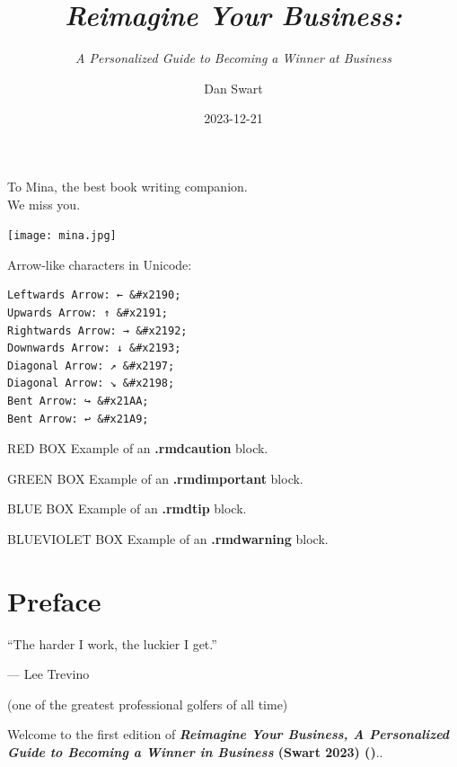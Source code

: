 \documentclass[
]{book}
\title{\emph{Reimagine Your Business:}}
\subtitle{\emph{A Personalized Guide to Becoming a Winner at Business}}
\author{Dan Swart}
\date{2023-12-21}
\renewcommand{\href}[2]{#2 (\url{#1})}
\begin{document}
\maketitle


\cleardoublepage\newpage\thispagestyle{empty}\null
\cleardoublepage\newpage
\thispagestyle{empty}

\begin{center}
To Mina, the best book writing companion. \\
We miss you.

\texttt{[image: mina.jpg]}

\end{center}

\setlength{\abovedisplayskip}{-5pt}
\setlength{\abovedisplayshortskip}{-5pt}

\cleardoublepage

{
\setcounter{tocdepth}{1}
\tableofcontents
}
Arrow-like characters in Unicode:

\begin{verbatim}
Leftwards Arrow: ← &#x2190;
Upwards Arrow: ↑ &#x2191;
Rightwards Arrow: → &#x2192;
Downwards Arrow: ↓ &#x2193;
Diagonal Arrow: ↗ &#x2197;
Diagonal Arrow: ↘ &#x2198;
Bent Arrow: ↪ &#x21AA;
Bent Arrow: ↩ &#x21A9;
\end{verbatim}

RED BOX Example of an \textbf{.rmdcaution} block.

GREEN BOX Example of an \textbf{.rmdimportant} block.

BLUE BOX Example of an \textbf{.rmdtip} block.

BLUEVIOLET BOX Example of an \textbf{.rmdwarning} block.

\hypertarget{preface}{%
\chapter*{Preface}\label{preface}}


``The harder I work, the luckier I get.''

--- Lee Trevino

(one of the greatest professional golfers of all time)

Welcome to the first edition of \textbf{\href{}{\emph{Reimagine Your Business, A Personalized Guide to Becoming a Winner in Business} (Swart 2023)}}..
\end{document}
